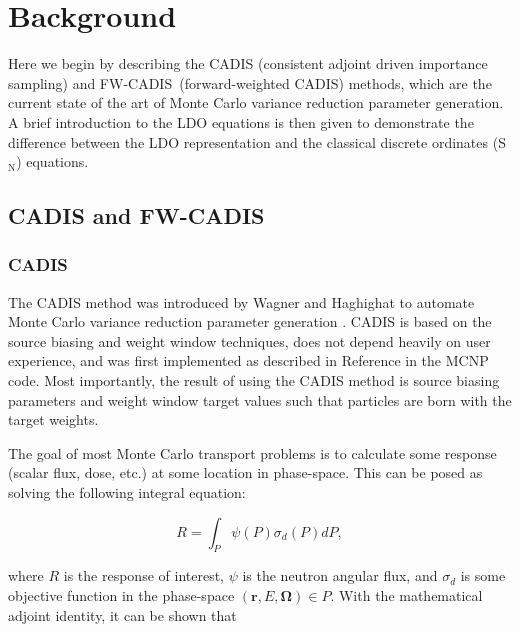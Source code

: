 \documentclass{article} %
\newcommand{\bo}{\mathbf\Omega}
\newcommand{\vecr}{\textbf{r}}
\newcommand{\sn}{S$_\mathrm{N}$}
\newcommand{\fwc}{\mbox{FW-CADIS}}
\begin{document}
\section{Background}
\label{sec:background}

Here we begin by describing the CADIS (consistent adjoint driven importance
sampling) and \fwc\ (forward-weighted CADIS) methods, which are the current
state of the art of Monte Carlo variance reduction parameter generation. A
brief introduction to the LDO equations is then given to demonstrate
the difference between the LDO representation and the classical discrete
ordinates (\sn) equations.

\subsection{CADIS and \fwc}

\subsubsection{CADIS}

The CADIS method was introduced by Wagner and Haghighat to automate Monte
Carlo variance reduction parameter generation \cite{cadis}. CADIS is based on
the source biasing and weight window techniques, does not depend heavily on
user experience, and was first implemented as described in Reference
\cite{cadis} in the MCNP code. Most importantly, the result of using the CADIS
method is source biasing parameters and weight window target values such that
particles are born with the target weights.

The goal of most Monte Carlo transport problems is to calculate some response
(scalar flux, dose, etc.) at some location in phase-space. This can be posed as
solving the following integral equation:

\begin{equation}
R = \int_P \psi(P)\sigma_d(P)dP,
\label{eq:cadis_r1}
\end{equation}

\noindent where $R$ is the response of interest, $\psi$ is the neutron angular
flux, and $\sigma_d$ is some objective function in the phase-space
$(\vecr, E, \bo) \in P$. With the mathematical adjoint identity, it can be
shown that
\end{document}

